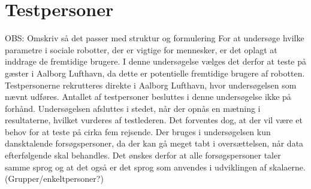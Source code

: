 \section{Testpersoner}
\label{ParametreTestpersoner}
%
OBS: Omskriv så det passer med struktur og formulering\blankline
%
For at undersøge hvilke parametre i sociale robotter, der er vigtige for mennesker, er det oplagt at inddrage de fremtidige brugere. I denne undersøgelse vælges det derfor at teste på gæster i Aalborg Lufthavn, da dette er potentielle fremtidige brugere af robotten. Testpersonerne rekrutteres direkte i Aalborg Lufthavn, hvor undersøgelsen som nævnt udføres. Antallet af testpersoner besluttes i denne undersøgelse ikke på forhånd. Undersøgelsen afsluttes i stedet, når der opnås en mætning i resultaterne, hvilket vurderes af testlederen. Det forventes dog, at der vil være et behov for at teste på cirka fem rejsende. Der bruges i undersøgelsen kun dansktalende forsøgspersoner, da der kan gå meget tabt i oversættelsen, når data efterfølgende skal behandles. Det ønskes derfor at alle forsøgspersoner taler samme sprog og at det også er det sprog som anvendes i udviklingen af skalaerne. (Grupper/enkeltpersoner?)